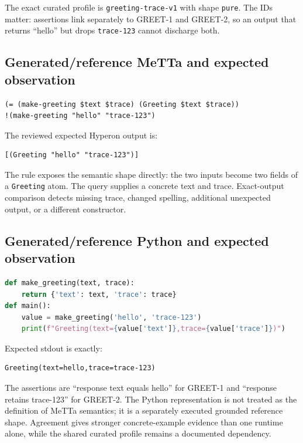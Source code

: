 \documentclass[11pt]{article}
\newcommand{\code}[1]{\texttt{#1}}
\begin{document}
The exact curated profile is \code{greeting-trace-v1} with shape
\code{pure}.  The IDs matter: assertions link separately to GREET-1 and
GREET-2, so an output that returns ``hello'' but drops \code{trace-123} cannot
discharge both.

\subsection{Generated/reference MeTTa and expected observation}

\begin{lstlisting}[language={}]
(= (make-greeting $text $trace) (Greeting $text $trace))
!(make-greeting "hello" "trace-123")
\end{lstlisting}

The reviewed expected Hyperon output is:

\begin{lstlisting}[language={}]
[(Greeting "hello" "trace-123")]
\end{lstlisting}

The rule exposes the semantic shape directly: the two inputs become two
fields of a \code{Greeting} atom.  The query supplies a concrete text and
trace.  Exact-output comparison detects missing trace, changed spelling,
additional unexpected output, or a different constructor.

\subsection{Generated/reference Python and expected observation}

\begin{lstlisting}[language=Python]
def make_greeting(text, trace):
    return {'text': text, 'trace': trace}
def main():
    value = make_greeting('hello', 'trace-123')
    print(f"Greeting(text={value['text']},trace={value['trace']})")
\end{lstlisting}

Expected stdout is exactly:

\begin{lstlisting}[language={}]
Greeting(text=hello,trace=trace-123)
\end{lstlisting}

The assertions are ``response text equals hello'' for GREET-1 and ``response
retains trace-123'' for GREET-2.  The Python representation is not treated as
the definition of MeTTa semantics; it is a separately executed grounded
reference shape.  Agreement gives stronger concrete-example evidence than
one runtime alone, while the shared curated profile remains a documented
dependency.
\end{document}
